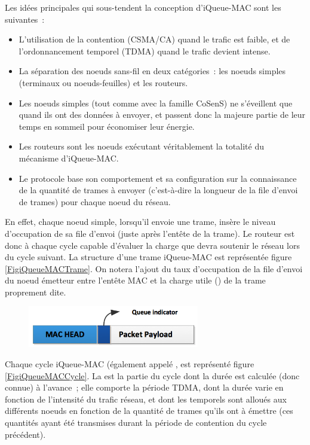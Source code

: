 Les idées principales qui sous-tendent la conception d'iQueue-MAC sont
les suivantes~:
\begin{itemize}
\item L'utilisation de la contention (CSMA/CA) quand le trafic est faible,
et de l'ordonnancement temporel (TDMA) quand le trafic devient intense.
\item La séparation des noeuds sans-fil en deux catégories~: les noeuds
simples (terminaux ou noeuds-feuilles) et les routeurs.
\item Les noeuds simples (tout comme avec la famille CoSenS) ne s'éveillent
que quand ils ont des données à envoyer, et passent donc la majeure partie
de leur temps en sommeil pour économiser leur énergie.
\item Les routeurs sont les noeuds exécutant véritablement la totalité
du mécanisme d'iQueue-MAC.
\item Le protocole base son comportement et sa configuration sur la
connaissance de la quantité de trames à envoyer (c'est-à-dire la
longueur de la file d'envoi de trames) pour chaque noeud du réseau.
\end{itemize}

En effet, chaque noeud simple, lorsqu'il envoie une trame, insère le
niveau d'occupation de sa file d'envoi (juste après l'entête de la trame).
Le routeur est donc à chaque cycle capable d'évaluer la charge que
devra soutenir le réseau lors du cycle suivant. La structure d'une
trame iQueue-MAC est représentée figure \vref{FigiQueueMACTrame}.
On notera l'ajout du taux d'occupation de la file d'envoi du noeud émetteur
entre l'entête MAC et la charge utile () de la trame
proprement dite.

\begin{figure}[!bpt]
\centering
\includegraphics[width=7.5cm]{images/ch3-iqueue-mac-paquet.png}
\label{FigiQueueMACTrame}
\end{figure}

Chaque cycle iQueue-MAC (également appelé , est
représenté figure \vref{FigiQueueMACCycle}. La  est
la partie du cycle dont la durée est calculée (donc connue) à l'avance~;
elle comporte la période TDMA, dont la durée varie en fonction de
l'intensité du trafic réseau, et dont les  temporels
sont alloués aux différents noeuds en fonction de la quantité
de trames qu'ils ont à émettre (ces quantités ayant été transmises
durant la période de contention du cycle précédent).

